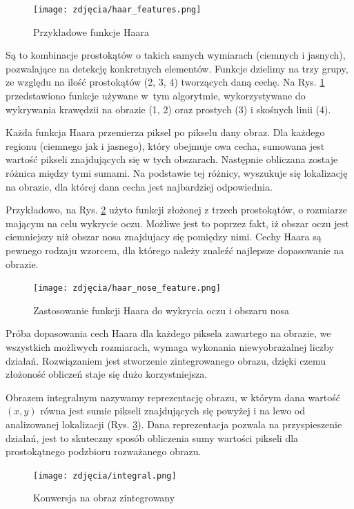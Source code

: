 \begin{figure}[h]
	\centering
	\texttt{[image: zdjęcia/haar\_features.png]}
	\caption{Przykładowe funkcje Haara \cite{haarCascade}} 
	\label{fig:haarFeatures}
\end{figure}

Są to kombinacje prostokątów  o takich samych wymiarach (ciemnych i jasnych), pozwalające na detekcję konkretnych elementów. Funkcje dzielimy na trzy grupy, ze względu na ilość prostokątów (2, 3, 4) tworzących daną cechę. Na Rys. \ref{fig:haarFeatures} przedstawiono funkcje używane w~tym algorytmie, wykorzystywane do wykrywania krawędzii na obrazie (1, 2) oraz prostych (3) i skośnych linii (4).

Każda funkcja Haara przemierza piksel po pikselu dany obraz. Dla każdego regionu (ciemnego jak i jasnego), który obejmuje owa cecha, sumowana jest wartość pikseli znajdujących się w tych obszarach. Następnie obliczana zostaje różnica między tymi sumami. Na podstawie tej różnicy, wyszukuje się lokalizację na obrazie, dla której dana cecha jest najbardziej odpowiednia. 

Przykładowo, na Rys. \ref{fig:haarNose} użyto funkcji złożonej z trzech prostokątów, o rozmiarze mającym na celu wykrycie oczu. Możliwe jest to poprzez fakt, iż obszar oczu jest ciemniejszy niż obszar nosa znajdujacy się pomiędzy nimi. Cechy Haara są pewnego rodzaju wzorcem, dla którego należy znaleźć najlepsze dopasowanie na obrazie.
 
\begin{figure}[h]
	\centering
	\texttt{[image: zdjęcia/haar\_nose\_feature.png]}
	\caption{Zastosowanie funkcji Haara do wykrycia oczu i obszaru nosa \cite{haar}} 
	\label{fig:haarNose}
\end{figure}

Próba dopasowania cech Haara dla każdego piksela zawartego na obrazie, we wszystkich możliwych rozmiarach, wymaga wykonania niewyobrażalnej liczby działań. Rozwiązaniem jest stworzenie zintegrowanego obrazu, dzięki czemu złożoność obliczeń staje się dużo korzystniejsza.

Obrazem integralnym nazywamy reprezentację obrazu, w którym dana wartość $(x, y)$ równa jest sumie pikseli znajdujących się powyżej i na lewo od analizowanej lokalizacji (Rys. \ref{fig:integralImage}). Dana reprezentacja pozwala na przyspieszenie działań, jest to skuteczny sposób obliczenia sumy wartości pikseli dla prostokątnego podzbioru rozważanego obrazu.
 
 \begin{figure}[h]
	\centering
	\texttt{[image: zdjęcia/integral.png]}
	\caption{Konwersja na obraz zintegrowany \cite{haarCascade}} 
	\label{fig:integralImage}
\end{figure}
 
